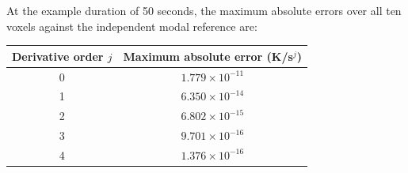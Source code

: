 At the example duration of 50 seconds, the maximum absolute errors
over all ten voxels against the independent modal reference are:
\begin{center}\begin{tabular}{cc}\toprule
Derivative order $j$ & Maximum absolute error (K/s$^j$) \\ \midrule
0 & $1.779\times 10^{-11}$ \\
1 & $6.350\times 10^{-14}$ \\
2 & $6.802\times 10^{-15}$ \\
3 & $9.701\times 10^{-16}$ \\
4 & $1.376\times 10^{-16}$ \\
\bottomrule\end{tabular}\end{center}
